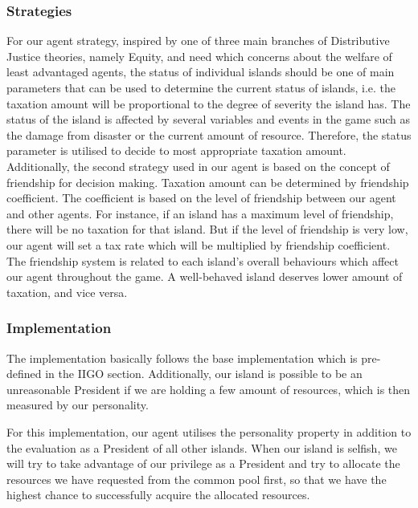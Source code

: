 \subsubsection{Strategies} \label{subsubsec:Team6_President:Strategies}
For our agent strategy, inspired by one of three main branches of Distributive Justice theories, namely Equity, and need which concerns about the welfare of least advantaged agents, the status of individual islands should be one of main parameters that can be used to determine the current status of islands, i.e. the taxation amount will be proportional to the degree of severity the island has. The status of the island is affected by several variables and events in the game such as the damage from disaster or the current amount of resource. Therefore, the status parameter is utilised to decide to most appropriate taxation amount. Additionally, the second strategy used in our agent is based on the concept of friendship for decision making. Taxation amount can be determined by friendship coefficient. The coefficient is based on the level of friendship between our agent and other agents. For instance, if an island has a maximum level of friendship, there will be no taxation for that island. But if the level of friendship is very low, our agent will set a tax rate which will be multiplied by friendship coefficient. The friendship system is related to each island’s overall behaviours which affect our agent throughout the game. A well-behaved island deserves lower amount of taxation, and vice versa. 

\subsubsection{Implementation} \label{subsubsec:Team6_President:Implementation}
The implementation basically follows the base implementation which is pre-defined in the IIGO section. Additionally, our island is possible to be an unreasonable President if we are holding a few amount of resources, which is then measured by our personality.

For this implementation, our agent utilises the personality property in addition to the evaluation as a President of all other islands. When our island is selfish, we will try to take advantage of our privilege as a President and try to allocate the resources we have requested from the common pool first, so that we have the highest chance to successfully acquire the allocated resources.

